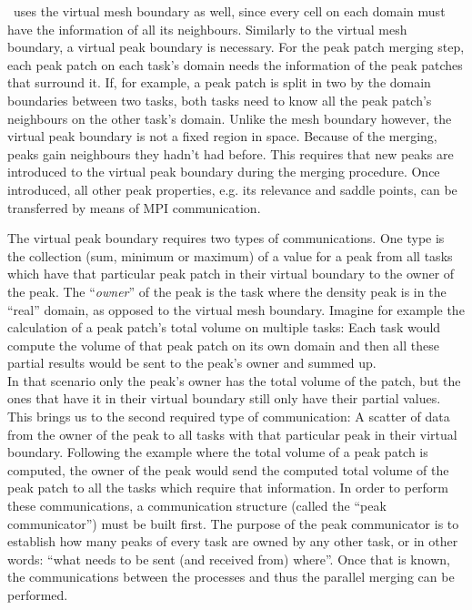 \phew\ uses the virtual mesh boundary as well, since every cell on each domain must have the information of all its neighbours.
Similarly to the virtual mesh boundary, a virtual peak boundary is necessary.
For the peak patch merging step, each peak patch on each task's domain needs the information of the peak patches that surround it.
If, for example, a peak patch is split in two by the domain boundaries between two tasks, both tasks need to know all the peak patch's neighbours on the other task's domain.
%
Unlike the mesh boundary however, the virtual peak boundary is not a fixed region in space.
Because of the merging, peaks gain neighbours they hadn't had before.
This requires that new peaks are introduced to the virtual peak boundary during the merging procedure.
Once introduced, all other peak properties, e.g. its relevance and saddle points, can be transferred by means of MPI communication.

The virtual peak boundary requires two types of communications. 
One type is the collection (sum, minimum or maximum) of a value for a peak from all tasks which have that particular peak patch in their virtual boundary to the owner of the peak.
The ``\emph{owner}'' of the peak is the task where the density peak is in the ``real'' domain, as opposed to the virtual mesh boundary.
Imagine for example the calculation of a peak patch's total volume on multiple tasks: 
Each task would compute the volume of that peak patch on its own domain and then all these partial results would be sent to the peak's owner and summed up.\\
%
In that scenario only the peak's owner has the total volume of the patch, but the ones that have it in their virtual boundary still only have their partial values.
This brings us to the second required type of communication:
A scatter of data from the owner of the peak to all tasks with that particular peak in their virtual boundary. 
Following the example where the total volume of a peak patch is computed, the owner of the peak would send the computed total volume of the peak patch to all the tasks which require that information. 
%
In order to perform these communications, a communication structure (called the ``peak communicator'') must be built first. 
The purpose of the peak communicator is to establish how many peaks of every task are owned by any other task, or in other words: ``what needs to be sent (and received from) where''.
Once that is known, the communications between the processes and thus the parallel merging can be performed.


